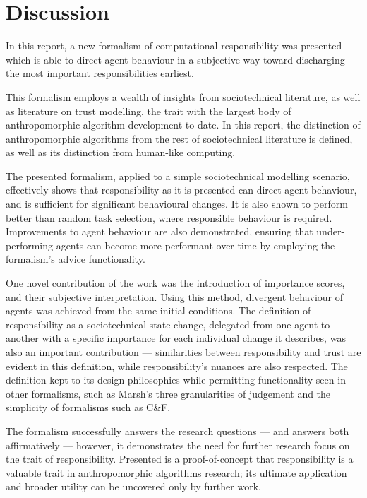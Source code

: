 \section{Discussion}\label{sec:discussion}
In this report, a new formalism of computational responsibility was presented which is able to direct agent behaviour in a subjective way toward discharging the most important responsibilities earliest.\par

This formalism employs a wealth of insights from sociotechnical literature, as well as literature on trust modelling, the trait with the largest body of anthropomorphic algorithm development to date. In this report, the distinction of anthropomorphic algorithms from the rest of sociotechnical literature is defined, as well as its distinction from  human-like computing.\par

The presented formalism, applied to a simple sociotechnical modelling scenario, effectively shows that responsibility as it is presented can direct agent behaviour, and is sufficient for significant behavioural changes. It is also shown to perform better than random task selection, where responsible behaviour is required. Improvements to agent behaviour are also demonstrated, ensuring that under-performing agents can become more performant over time by employing the formalism's advice functionality.\par

One novel contribution of the work was the introduction of importance scores, and their subjective interpretation. Using this method, divergent behaviour of agents was achieved from the same initial conditions. The definition of responsibility as a sociotechnical state change, delegated from one agent to another with a specific importance for each individual change it describes, was also an important contribution --- similarities between responsibility and trust are evident in this definition, while responsibility's nuances are also respected. The definition kept to its design philosophies while permitting functionality seen in other formalisms, such as Marsh's three granularities of judgement and the simplicity of formalisms such as C\&F.\par

The formalism successfully answers the research questions --- and answers both affirmatively --- however, it demonstrates the need for further research focus on the trait of responsibility. Presented is a proof-of-concept that responsibility is a valuable trait in anthropomorphic algorithms research; its ultimate application and broader utility can be uncovered only by further work.




